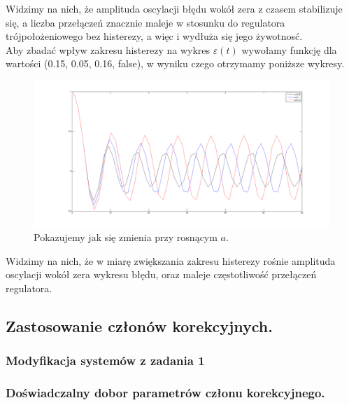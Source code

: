 \documentclass[a4paper,10pt]{article}
\begin{document}
Widzimy na nich, że amplituda oscylacji błędu wokół zera z czasem stabilizuje się, a liczba przełączeń znacznie maleje w stosunku do regulatora trójpołożeniowego bez histerezy, a więc i wydłuża się jego żywotnosć. \\
Aby zbadać wpływ zakresu histerezy na wykres $\varepsilon(t)$ wywołamy funkcję dla wartości (0.15, 0.05, 0.16, false), w wyniku czego otrzymamy poniższe wykresy.

\begin{figure}[!h]
    \centering
	\includegraphics[width=120mm]{CW3-trojpolozeniowy-e-n015.png}
	\caption{Pokazujemy jak się zmienia przy rosnącym $a$.}
    \label{fig:Rysunek}
\end{figure}

\newpage Widzimy na nich, że w miarę zwiększania zakresu histerezy rośnie amplituda oscylacji wokół zera wykresu błędu, oraz maleje częstotliwość przełączeń regulatora.



\subsection{Zastosowanie członów korekcyjnych.}\label{sec:zad2}
\subsubsection{Modyfikacja systemów z zadania 1}\label{sec:zad2_1}
\subsubsection{Doświadczalny dobor parametrów członu korekcyjnego.}\label{sec:zad2_2}
\end{document}
